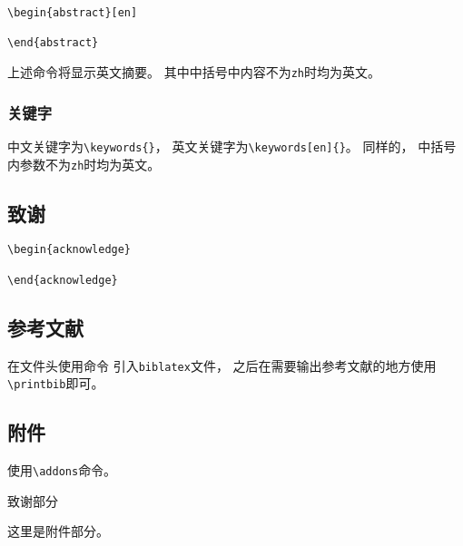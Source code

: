 \documentclass{hainanuthesis}
\begin{document}
\begin{verbatim}
\begin{abstract}[en]

\end{abstract}
\end{verbatim}

上述命令将显示英文摘要。
其中中括号中内容不为\verb|zh|时均为英文。

\subsubsection{关键字}

中文关键字为\verb|\keywords{}|，
英文关键字为\verb|\keywords[en]{}|。
同样的，
中括号内参数不为\verb|zh|时均为英文。

\subsection{致谢}

\begin{verbatim}
\begin{acknowledge}

\end{acknowledge}
\end{verbatim}

\subsection{参考文献}

在文件头使用命令
\verb||
引入\verb|biblatex|文件，
之后在需要输出参考文献的地方使用
\verb|\printbib|即可。

\subsection{附件}

使用\verb|\addons|命令。

\begin{acknowledge}
    致谢部分
\end{acknowledge}

\addons

这里是附件部分。
\end{document}
